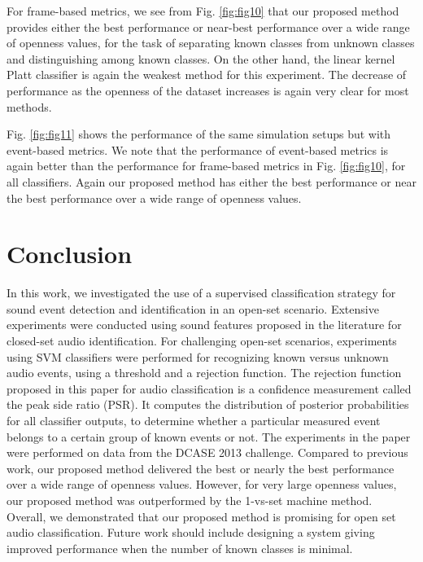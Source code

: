 \documentclass{ieeeaccess}
\begin{document}
For frame-based metrics, we see from Fig. \ref{fig:fig10} that our proposed method provides either the best performance or near-best performance over a wide range of openness values, for the task of separating known classes from unknown classes and distinguishing among known classes. On the other hand, the linear kernel Platt classifier is again the weakest method for this experiment. The decrease of performance as the openness of the dataset increases is again very clear for most methods.  
 
Fig. \ref{fig:fig11} shows the performance of the same simulation setups but with event-based metrics. We note that the performance of event-based metrics is again better than the performance for frame-based metrics in Fig. \ref{fig:fig10}, for all classifiers. Again our proposed method has either the best performance or near the best performance over a wide range of openness values. 
 
\section{Conclusion} \label{sec:IX}
In this work, we investigated the use of a supervised classification strategy for sound event detection and identification in an open-set scenario. Extensive experiments
were conducted using sound features proposed in the literature for closed-set audio identification. For challenging open-set scenarios, experiments using SVM classifiers were performed for recognizing known versus unknown audio events, using a threshold and a rejection function. The rejection function proposed in this paper for audio classification is a confidence measurement called the peak side ratio (PSR). It computes the distribution of posterior probabilities for all classifier outputs, to determine whether a particular measured event belongs to a certain group of known events or not. The experiments in the paper were performed on data from the DCASE 2013 challenge. Compared to previous work, our proposed method delivered the best or nearly the best performance over a wide range of openness values. However, for very large openness values, our proposed method was outperformed by the 1-vs-set machine method. \\
Overall, we demonstrated that our proposed method is promising for open set audio classification. Future work should include designing a system giving improved performance when the number of known classes is minimal.
\end{document}
